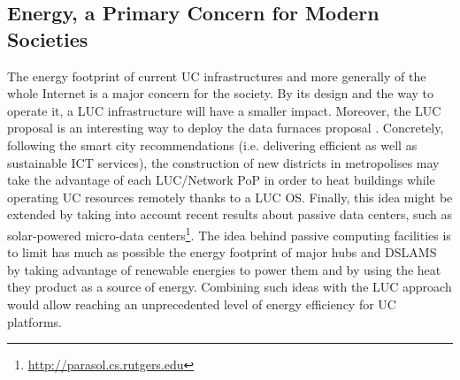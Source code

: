 \subsection{Energy, a Primary Concern for Modern Societies}

The energy footprint of current UC infrastructures and more generally of the
whole Internet is a major concern for the society.  By its design and the way
to operate it, a LUC infrastructure will have a smaller impact.
 Moreover, the LUC proposal is an interesting way to
deploy the data furnaces proposal \cite{liu:hotcloud11}.  Concretely, following
the smart city recommendations (i.e. delivering efficient as well as
sustainable ICT services), the construction of new districts in metropolises
may take the advantage of each LUC/Network PoP in order to heat buildings while
operating UC resources remotely thanks to a LUC OS. Finally, this idea might
be extended by taking into account recent results about passive data centers,
such as solar-powered
micro-data centers\footnote{\href{http://parasol.cs.rutgers.edu}{\url{http://parasol.cs.rutgers.edu}}}.
The idea behind passive computing facilities is to limit has much as possible
the energy footprint of major hubs and DSLAMS by taking advantage of renewable
energies to power them and by using the heat they product as a source of
energy. Combining such ideas with the LUC approach would allow reaching an
unprecedented level of energy efficiency for UC platforms.

